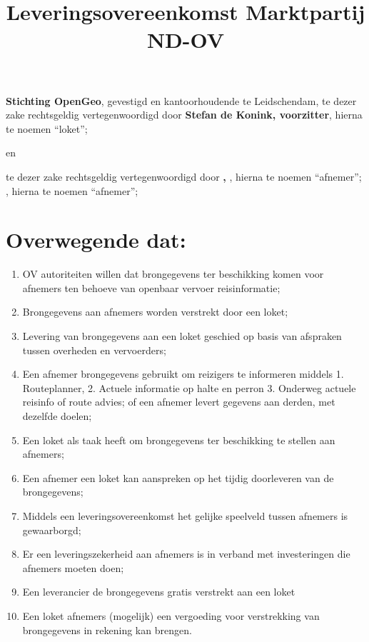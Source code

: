 \documentclass[10pt, a4paper]{article}
\title{Leveringsovereenkomst Marktpartij ND-OV\vspace{-2ex}}
\begin{document}
\maketitle
\thispagestyle{empty}
\pagestyle{empty}
\textbf{Stichting OpenGeo}, gevestigd en kantoorhoudende te Leidschendam, te dezer zake rechtsgeldig vertegenwoordigd door \textbf{Stefan de Konink, voorzitter}, hierna te noemen ``loket'';
\begin{center}
en\\
\end{center}
\ifdefined\onderneming
    \textbf{\onderneming} te dezer zake rechtsgeldig vertegenwoordigd door \textbf{\tekenbevoegd, \functie}, hierna te noemen ``afnemer'';
\else
    \textbf{\tekenbevoegd}, hierna te noemen ``afnemer'';
\fi

\section*{Overwegende dat:}
\begin{enumerate}
\item OV autoriteiten willen dat brongegevens ter beschikking komen voor afnemers ten behoeve van openbaar vervoer reisinformatie;
\item Brongegevens aan afnemers worden verstrekt door een loket;
\item Levering van brongegevens aan een loket geschied op basis van afspraken tussen overheden en vervoerders;
\item Een afnemer brongegevens gebruikt om reizigers te informeren middels 1. Routeplanner, 2. Actuele informatie op halte en perron 3. Onderweg actuele reisinfo of route advies; of een afnemer levert gegevens aan derden, met dezelfde doelen;
\item Een loket als taak heeft om brongegevens ter beschikking te stellen aan afnemers;
\item Een afnemer een loket kan aanspreken op het tijdig doorleveren van de brongegevens;
\item Middels een leveringsovereenkomst het gelijke speelveld tussen afnemers is gewaarborgd;
\item Er een leveringszekerheid aan afnemers is in verband met investeringen die afnemers moeten doen;
\item Een leverancier de brongegevens gratis verstrekt aan een loket
\item Een loket afnemers (mogelijk) een vergoeding voor verstrekking van brongegevens in rekening kan brengen.
\end{enumerate}
\end{document}
